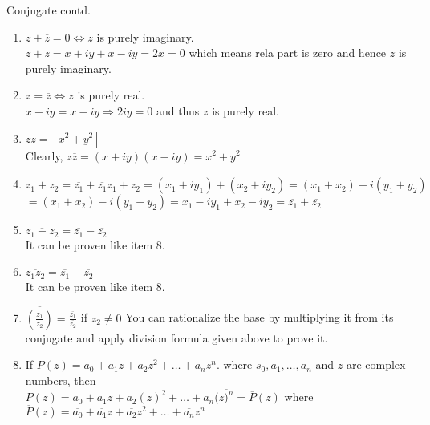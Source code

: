 \documentclass[aspectratio=169,8pt]{beamer}
\newcounter{counter}
\begin{document}
\begin{frame}{Conjugate contd.}
  \begin{enumerate}
    \setcounter{enumi}{\value{counter}}
  \item $z + \overline{z} = 0 \Leftrightarrow z$ is purely imaginary.\\
    $z + \overline{z} = x + iy + x - iy = 2x = 0$ which means rela part is zero and hence $z$ is purely imaginary.
  \item $z = \overline{z} \Leftrightarrow z$ is purely real.\\
    $x + iy = x -iy \Rightarrow 2iy = 0$ and thus $z$ is purely real.
  \item $z\overline{z} = [x^2 + y^2]$\\
    Clearly, $z\overline{z} = (x + iy)(x - iy) = x^2 + y^2$
  \item $\overline{z_1 + z_2} = \overline{z_1} + \overline{z_1}\overline{z_1 + z_2} = \overline{(x_1 + iy_1) + (x_2 + iy_2)} = \overline{(x_1 + x_2) + i(y_1 + y_2)}$\\
    $= (x_1 + x_2) -i(y_1 + y_2) = x_1 - iy_1 + x_2 - iy_2 = \overline{z_1} + \overline{z_2}$
  \item $\overline{z_1 - z_2} = \overline{z_1} - \overline{z_2}$\\
    It can be proven like item 8.
  \item $\overline{z_1z_2} = \overline{z_1} - \overline{z_2}$\\
    It can be proven like item 8.
  \item $\overline{\left(\frac{z_1}{z_2}\right)} = \frac{\overline{z_1}}{\overline{z_2}}$ if $z_2\neq 0$
    You can rationalize the base by multiplying it from its conjugate and apply division formula given above to prove it.
  \item If $P(z) = a_0 + a_1z + a_2z^2 + \ldots + a_nz^n.$ where $s_0, a_1, \ldots, a_n$ and $z$ are complex numbers, then\\
    $\overline{P(z)} = \overline{a_0} + \overline{a_1}\overline{z} + \overline{a_2}(\overline{z})^2 + \ldots + \overline{a_n}(\overline{z)^n} = \overline{P}(\overline{z})$ where\\
    $\overline{P}(z) = \overline{a_0} + \overline{a_1}z + \overline{a_2}z^2 + \ldots + \overline{a_n}z^n$
    \setcounter{counter}{\value{enumi}}
  \end{enumerate}
\end{frame}
\end{document}
